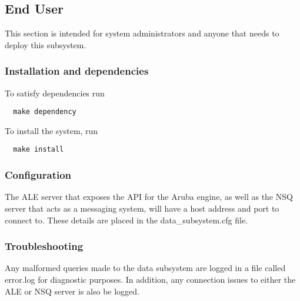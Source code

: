 \subsection{End User}
This section is intended for system administrators and anyone that needs to deploy this subsystem.
\subsubsection{Installation and dependencies}
To satisfy dependencies run
\begin{verbatim}
  make dependency
\end{verbatim}
To install the system, run
\begin{verbatim}
  make install
\end{verbatim}
\subsubsection{Configuration}
The ALE server that exposes the API for the Aruba engine, as well as the NSQ server that acts as a messaging system, will have a host address and port to connect to. These details are placed in the data_subsystem.cfg file.
\subsubsection{Troubleshooting}
Any malformed queries made to the data subsystem are logged in a file called error.log for diagnostic purposes. In addition, any connection issues to either the ALE or NSQ server is also be logged.
